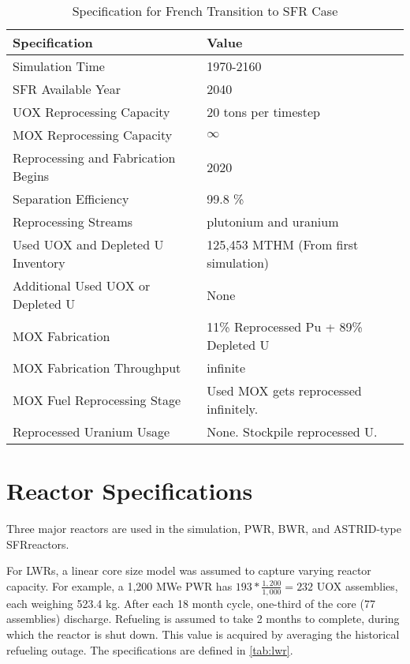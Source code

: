 \begin{table}[h]
	\centering
	\begin{tabularx}{\textwidth}{bb}
		\hline
		\textbf{Specification }& \textbf{Value} \\
		\hline
		Simulation Time & 1970-2160 \\
		\gls{SFR} Available Year & 2040 \\
		\gls{UOX} Reprocessing Capacity & 20 tons per timestep \\
		\gls{MOX} Reprocessing Capacity & $\infty$ \\
		Reprocessing and Fabrication Begins & 2020 \\
		Separation Efficiency & 99.8 \% \\
		Reprocessing Streams & plutonium and uranium \\
		\small{Used \gls{UOX} and Depleted U Inventory} & 125,453 MTHM {\small (From first simulation)} \\
		\small{Additional Used \gls{UOX} or Depleted U} & None  \\
		\gls{MOX} Fabrication &  \small{11\% Reprocessed Pu + 89\% Depleted U}  \\
		\gls{MOX} Fabrication Throughput & infinite \\
		\gls{MOX} Fuel Reprocessing Stage &  Used \gls{MOX} gets reprocessed infinitely. \\
		Reprocessed Uranium Usage &  None. Stockpile reprocessed U. \\
		\hline
	\end{tabularx}
	\caption {Specification for French Transition to \gls{SFR} Case}
	\label{tab:sim_france}
\end{table}


\section{Reactor Specifications}
Three major reactors are used in the simulation, \gls{PWR}, \gls{BWR}, and ASTRID-type \gls{SFR}reactors.

For \glspl{LWR}, a linear core size model was assumed to capture
varying reactor capacity. For example, a 
1,200 MWe PWR has $193*\frac{1,200}{1,000} = 232$ \gls{UOX} assemblies, each
weighing 523.4 kg.
After each 18 month cycle, one-third of the 
core (77 assemblies) discharge. Refueling
is assumed to take 2 months to complete, during which the reactor
is shut down. This value is acquired by averaging the 
historical refueling outage. The specifications are defined in \cref{tab:lwr}.

